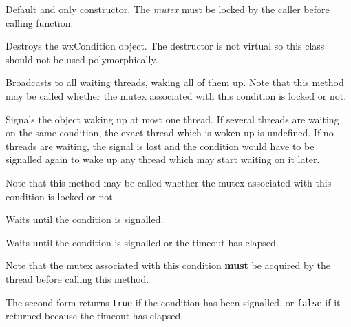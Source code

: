 
Default and only constructor. The {\it mutex} must be locked by the caller
before calling  function.



Destroys the wxCondition object. The destructor is not virtual so this class
should not be used polymorphically.

\label{wxconditionbroadcast}


Broadcasts to all waiting threads, waking all of them up. Note that this method
may be called whether the mutex associated with this condition is locked or
not.



\label{wxconditionsignal}


Signals the object waking up at most one thread. If several threads are waiting
on the same condition, the exact thread which is woken up is undefined. If no
threads are waiting, the signal is lost and the condition would have to be
signalled again to wake up any thread which may start waiting on it later.

Note that this method may be called whether the mutex associated with this
condition is locked or not.



\label{wxconditionwait}


Waits until the condition is signalled.


Waits until the condition is signalled or the timeout has elapsed.

Note that the mutex associated with this condition {\bf must} be acquired by
the thread before calling this method.





The second form returns {\tt true} if the condition has been signalled, or
{\tt false} if it returned because the timeout has elapsed.



